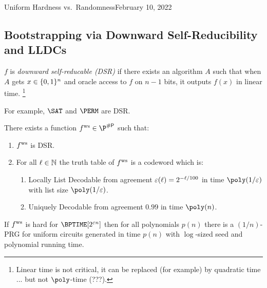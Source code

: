 \begin{lecture}{4}{Uniform Hardness vs.\ Randomness}{February 10, 2022}
\subsection{Bootstrapping via Downward Self-Reducibility and LLDCs}

\begin{definition}
  $f$ is \emph{downward self-reducable (DSR)} if there exists an algorithm $A$
  such that when $A$ gets $x \in \{0, 1\}^n$ and oracle access to $f$ on $n -
  1$ bits, it outputs $f(x)$ in linear time.%
  \footnote{Linear time is not critical, it can be replaced (for example) by
	quadratic time ... but not $\poly$-time (???).}
\end{definition}

For example, $\SAT$ and $\PERM$ are DSR.

\begin{proposition}
  There exists a function $\fws \in \P^{\sharpp}$ such that:
  \begin{enumerate}
    \item $ f^{\text{ws}} $ is DSR.
    \item For all $\ell \in \mathbb{N}$ the truth table of $ f^{\text{ws}} $ is a codeword
      which is:
      \begin{enumerate}
        \item Locally List Decodable from agreement $\varepsilon(\ell) = 2^{-\ell /
          100}$ in time $\poly(1/\eps)$ with list size $\poly(1 / \eps)$.
        \item Uniquely Decodable from agreement $0.99$ in time $\poly(n)$.
      \end{enumerate}
  \end{enumerate}
\end{proposition}

\begin{theorem}
  If $ f^{\text{ws}} $ is hard for $\BPTIME\brac{2^{\eps n}}$ then for all polynomials
  $p(n)$ there is a $(1 / n)$-PRG for uniform circuits generated in time $p(n)$
  with $\log$-sized seed and polynomial running time.
\end{theorem}


\end{lecture}
